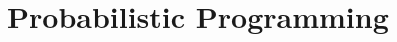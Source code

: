 \documentclass{article}
\begin{document}
%
%
%
%
%

\section{Probabilistic Programming}
\end{document}
